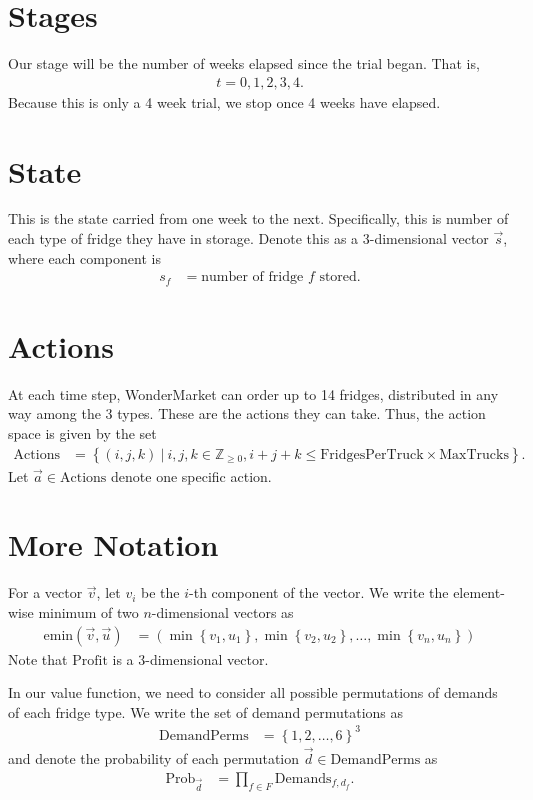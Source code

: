 \documentclass[11pt,a4paper]{article}
\begin{document}
\section{Stages}
Our stage will be the number of weeks elapsed since the trial began. That is, 
\begin{align*}
    t = 0, 1, 2, 3, 4.
\end{align*}
Because this is only a 4 week trial, we stop once 4 weeks have elapsed.

\section{State}
This is the state carried from one week to the next. Specifically, this is 
number of each type of fridge they have in storage. Denote this as a 3-dimensional 
vector $\vec s$, where each component is
\begin{align*}
    s_f &= \text{number of fridge $f$ stored.} 
\end{align*}

\section{Actions}
At each time step, WonderMarket can order up to 14 fridges, distributed in any way 
among the 3 types. These are the actions they can take. Thus, the action space is given by the set 
\begin{align*}
    \mathrm{Actions} &= \left\{ (i, j, k)  ~|~ i, j, k \in \mathbb Z_{\ge 0}, i+j+k \le \mathrm{FridgesPerTruck}\times \mathrm{MaxTrucks}\right\}.
\end{align*}
Let $\vec a \in \mathrm{Actions}$ denote one specific action.


\section{More Notation}
For a vector $\vec v$, let $v_i$ be the $i$-th component of the vector.
We write the element-wise minimum of two $n$-dimensional vectors as 
\begin{align*}
     \mathrm{emin}( \vec v, \vec u ) &= \left( \min \left\{ v_1, u_1 \right\}, \min \left\{ v_2, u_2 \right\}, \ldots, \min \left\{ v_n, u_n \right\} \right)
\end{align*}
Note that $\mathrm{Profit}$ is a 3-dimensional vector. 

In our value function, we need to consider all possible permutations of demands 
of each fridge type. We write the set of demand permutations as  
\begin{align*}
    \mathrm{DemandPerms} &= \left\{ 1, 2, \ldots, 6\right\}^3
\end{align*}
and denote the probability of each permutation $\vec d \in \mathrm{DemandPerms}$ 
as 
\begin{align*}
    \mathrm{Prob}_\vec d &= \prod_{f \in F} \mathrm{Demands}_{f, d_f}.
\end{align*}
\end{document}
